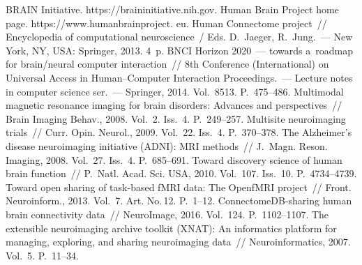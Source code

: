 \begin{multicols}{2}
\vspace*{-6pt}


{\small\frenchspacing
 {%
 \begin{thebibliography}{99}
 
 \vspace*{-3pt}
 
  BRAIN Initiative. {\sf https://braininitiative.nih.gov}.
  Human Brain Project home page. {\sf https://www.\linebreak humanbrainproject. eu}.
   Human Connectome project~// Encyclopedia of 
computational neuroscience~/
Eds. D.~Jaeger, R.~Jung.~--- New York, NY, USA: Springer, 2013. 4~p.
   BNCI Horizon  
2020~--- towards a~roadmap for brain/neural computer interaction~// 8th 
Conference (International) on Universal Access in Human--Computer Interaction 
Proceedings.~--- Lecture notes in computer science ser.~--- Springer, 2014. 
Vol.~8513. P.~475--486. 
   Multimodal 
magnetic resonance imaging for brain disorders: Advances and perspectives~// 
Brain Imaging Behav., 2008. Vol.~2. Iss.~4. P.~249--257.
   Multisite neuroimaging trials~// Curr. 
Opin. Neurol., 2009. Vol.~22. Iss.~4. P.~370--378. 
   The Alzheimer's 
disease neuroimaging initiative (ADNI): MRI methods~// J.~Magn. Reson. 
Imaging, 2008. Vol.~27. Iss.~4. P.~685--691.
   Toward discovery 
science of human brain function~// P.~Natl. Acad. Sci. USA, 
2010. Vol.~107. Iss.~10. P.~4734--4739.
   Toward open 
sharing of task-based fMRI data: The OpenfMRI project~// Front. Neuroinform., 
2013. Vol.~7. Art. No.\,12. P.~1--12.
ConnectomeDB-sharing human brain connectivity data~// NeuroImage, 2016. 
Vol.~124. P.~1102--1107.
   The extensible 
neuroimaging archive toolkit (XNAT): An informatics platform for managing, 
exploring, and sharing neuroimaging data~// Neuroinformatics, 2007. Vol.~5. 
P.~11--34.

\end{thebibliography}}}
\end{multicols}
